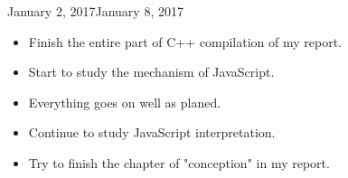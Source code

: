 \begin{fichesuivi}{January 2, 2017}{January 8, 2017}

   \begin{travaileffectue}
        \begin{itemize}
            \item Finish the entire part of C++ compilation of my report.
            \item Start to study the mechanism of JavaScript.
        \end{itemize}
   \end{travaileffectue}

   \begin{travailnoneffectue}
        \begin{itemize}
             \item Everything goes on well as planed. 
        \end{itemize}
   \end{travailnoneffectue}

 
   \begin{planification}
        \begin{itemize}
            \item Continue to study JavaScript interpretation.
            \item Try to finish the chapter of "conception" in my report.
        \end{itemize}
   \end{planification}
\end{fichesuivi}





